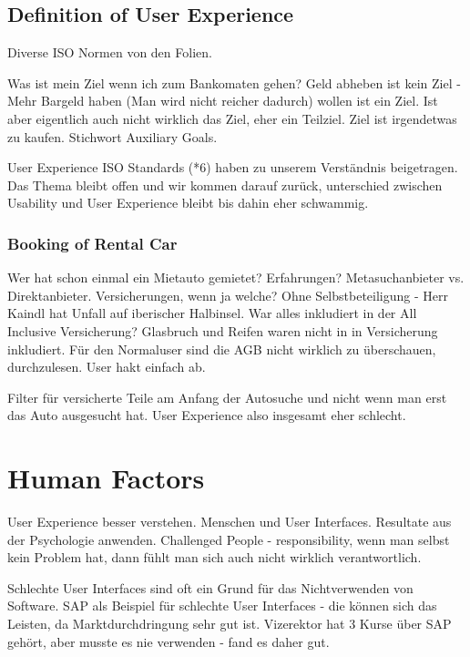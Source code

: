 \subsection{Definition of User Experience}

Diverse ISO Normen von den Folien.

Was ist mein Ziel wenn ich zum Bankomaten gehen?
Geld abheben ist kein Ziel - Mehr Bargeld haben (Man wird nicht reicher dadurch)
wollen ist ein Ziel. Ist aber eigentlich auch nicht wirklich das Ziel, eher ein
Teilziel. Ziel ist irgendetwas zu kaufen. Stichwort Auxiliary Goals.

User Experience ISO Standards (*6) haben zu unserem Verständnis beigetragen.
Das Thema bleibt offen und wir kommen darauf zurück, unterschied zwischen
Usability und User Experience bleibt bis dahin eher schwammig.

\subsubsection{Booking of Rental Car}
Wer hat schon einmal ein Mietauto gemietet? Erfahrungen? Metasuchanbieter vs.
Direktanbieter.
Versicherungen, wenn ja welche? Ohne Selbstbeteiligung - Herr Kaindl hat Unfall
auf iberischer Halbinsel. 
War alles inkludiert in der All Inclusive Versicherung? Glasbruch und Reifen
waren nicht in in Versicherung inkludiert. Für den Normaluser sind die AGB
nicht wirklich zu überschauen, durchzulesen. User hakt einfach ab.

Filter für versicherte Teile am Anfang der Autosuche und nicht wenn man erst 
das Auto ausgesucht hat. User Experience also insgesamt eher schlecht.

\section{Human Factors}
User Experience besser verstehen. Menschen und User Interfaces. Resultate
aus der Psychologie anwenden. 
Challenged People - responsibility, wenn man selbst kein Problem hat, dann fühlt
man sich auch nicht wirklich verantwortlich.

Schlechte User Interfaces sind oft ein Grund für das Nichtverwenden von Software.
SAP als Beispiel für schlechte User Interfaces - die können sich das Leisten,
da Marktdurchdringung sehr gut ist. Vizerektor hat 3 Kurse über SAP gehört, aber
musste es nie verwenden - fand es daher gut.

